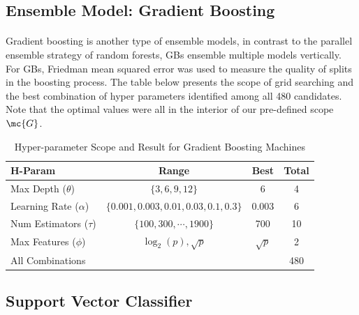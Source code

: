 \documentclass[11pt]{article}
\begin{document}
 	\subsection{Ensemble Model: Gradient Boosting}
 	\paragraph{} Gradient boosting is another type of ensemble models, in contrast to the parallel ensemble strategy of random forests, GBs ensemble multiple models vertically. For GBs, Friedman mean squared error was used to measure the quality of splits in the boosting process. The table below presents the scope of grid searching and the best combination of hyper parameters identified among all 480 candidates. Note that the optimal values were all in the interior of our pre-defined scope $\mc{G}$.
 	\begin{table}[H]
 		\centering
 		\begin{tabular}{l|c|c|c}
 		H-Param & Range & Best & Total \\
 		\hline
 		Max Depth ($\theta$) & $\{3, 6, 9, 12\}$ & 6 & 4 \\
 		Learning Rate ($\alpha$) & $\{0.001, 0.003, 0.01, 0.03, 0.1, 0.3\}$ & 0.003 & 6 \\
 		Num Estimators ($\tau$) & $\{100, 300, \cdots, 1900\}$ & 700 & 10 \\
 		Max Features ($\phi$) & $\log_2(p), \sqrt{p}$& $\sqrt{p}$ & 2\\
 		\hline
 		All Combinations & & & 480
 		\end{tabular}
 		\caption{Hyper-parameter Scope and Result for Gradient Boosting Machines}
 	\end{table}
 	
 	\subsection{Support Vector Classifier}
\end{document}

